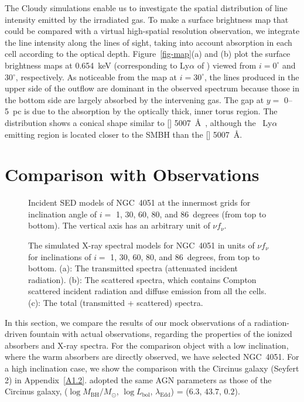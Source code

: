 \documentclass[twocolumn,times,twocolappendix]{aastex63}
\begin{document}
The Cloudy simulations enable us to investigate the
spatial distribution of line intensity emitted by the irradiated gas.
To make a surface brightness map
that could be compared with a virtual high-spatial resolution observation,
we integrate the line intensity along the lines of
sight, taking into account absorption in each cell
according to the optical depth.
Figure~\ref{fig-map}(a) and (b) plot the surface brightness maps at 0.654~keV
(corresponding to Ly$\alpha$ of ) viewed from $i=0^\circ$
and 30$^\circ$, respectively. 
As noticeable from the map at $i=30^\circ$, the lines
produced in the upper side of the outflow are dominant in the observed spectrum
because
those in the bottom side are largely absorbed by the intervening gas.
The gap at $y =$ 0--5~pc is due to the absorption
by the optically thick, inner torus region.
The  distribution shows a conical shape similar to []
5007~\AA\ \citep{Wada2018b}, although the ~Ly$\alpha$
emitting region is located closer to the SMBH than the []
5007~\AA. 

\section{Comparison with Observations}
\label{sec4}

\begin{figure}
\caption{
  Incident SED models of NGC~4051 at the innermost grids for
  inclination angle of $i=$ 1, 30, 60, 80, and 86~degrees (from top to
  bottom).
The vertical axis has an arbitrary unit of $\nu f_\nu$.}
\label{fig-insed2}
\end{figure}


\begin{figure*}
\caption{
The simulated X-ray spectral models for NGC~4051
in units of $\nu f_\nu$ for inclinations of $i=$ 1, 30, 60, 80, and 86~degrees, from top to bottom.
(a): The transmitted spectra (attenuated incident radiation).
(b): The scattered spectra, which contains Compton scattered incident radiation and diffuse emission from all the cells.
(c): The total (transmitted + scattered) spectra.
}
\label{fig_outsed2}
\end{figure*}

In this section, we compare the results of our mock observations of a
radiation-driven fountain with actual observations, regarding the
properties of the ionized absorbers and X-ray spectra. For the
comparison object with a low inclination, where the warm absorbers are
directly observed, we have selected NGC~4051.
For a high inclination case, we show the comparison
with the Circinus galaxy (Seyfert 2) in Appendix~\ref{A1.2}.
\citet{Wada2016} adopted the same AGN parameters as those of the Circinus galaxy, 
($\log M_\mathrm{BH}/M_\odot$, $\log L_\mathrm{bol}$, $\lambda_\mathrm{Edd}$)
= ($6.3$, $43.7$, $0.2$).
\end{document}
